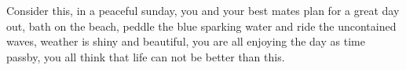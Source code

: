 Consider this, in a peaceful sunday, you and your best mates plan for a great day out, bath on the beach, peddle the blue sparking water and ride the uncontained waves, weather is shiny and beautiful, you are all enjoying the day as time passby, you all think that life can not be better than this.  